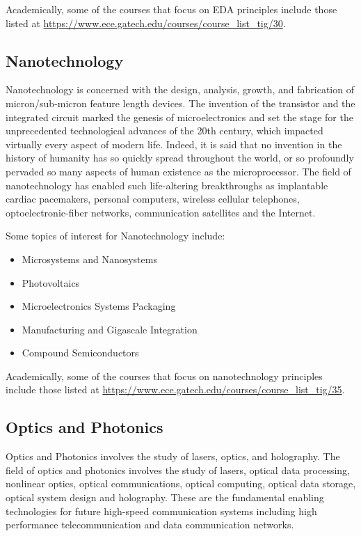 \documentclass[12pt]{article}
\begin{document}
Academically, some of the courses that focus on EDA principles include those listed at \url{https://www.ece.gatech.edu/courses/course_list_tig/30}.

\subsection{Nanotechnology}

Nanotechnology is concerned with the design, analysis, growth, and fabrication of micron/sub-micron feature length devices. The invention of the transistor and the integrated circuit marked the genesis of microelectronics and set the stage for the unprecedented technological advances of the 20th century, which impacted virtually every aspect of modern life. Indeed, it is said that no invention in the history of humanity has so quickly spread throughout the world, or so profoundly pervaded so many aspects of human existence as the microprocessor. The field of nanotechnology has enabled such life-altering breakthroughs as implantable cardiac pacemakers, personal computers, wireless cellular telephones, optoelectronic-fiber networks, communication satellites and the Internet.

Some topics of interest for Nanotechnology include:

\begin{itemize}
    \item Microsystems and Nanosystems
    \item Photovoltaics
    \item Microelectronics Systems Packaging
    \item Manufacturing and Gigascale Integration
    \item Compound Semiconductors
\end{itemize}

Academically, some of the courses that focus on nanotechnology principles include those listed at \url{https://www.ece.gatech.edu/courses/course_list_tig/35}.

\subsection{Optics and Photonics}

Optics and Photonics involves the study of lasers, optics, and holography.
The field of optics and photonics involves the study of lasers, optical data processing, nonlinear optics, optical communications, optical computing, optical data storage, optical system design and holography. These are the fundamental enabling technologies for future high-speed communication systems including high performance telecommunication and data communication networks.
\end{document}
